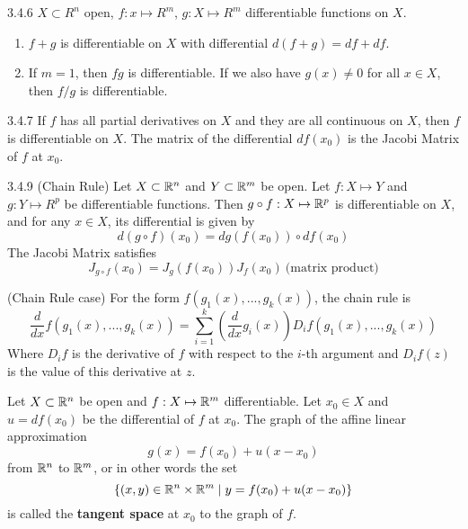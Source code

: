 \begin{proposition}{3.4.6}
    $X \subset R^n$ open, $f: x \mapsto R^m$, $g: X \mapsto R^m$ differentiable functions on $X$.
    \begin{enumerate}
        \item $f + g$ is differentiable on $X$ with differential $d(f + g) = df + df$.
        \item If $m = 1$, then $fg$ is differentiable. If we also have $g(x) \ne 0$ for all
              $x \in X$, then $f/g$ is differentiable.
    \end{enumerate}
\end{proposition}

\begin{proposition}{3.4.7}
    If $f$ has all partial derivatives on $X$ and they are all continuous on $X$, then $f$ is differentiable on $X$.
    The matrix of the differential $df(x_0)$ is the Jacobi Matrix of $f$ at $x_0$.
\end{proposition}

\begin{proposition}{3.4.9 (Chain Rule)}
    Let $X \subset \mathbb{R}^n$ and $Y \subset \mathbb{R}^m$ be open.
    Let $f: X \mapsto Y$ and $g: Y \mapsto R^p$ be differentiable functions.
    Then $g \circ f: X \mapsto \mathbb{R}^p$ is differentiable on $X$, and for any $x \in X$, its differential is given by
    \[ d(g \circ f)(x_0) = dg(f(x_0)) \circ df(x_0) \]
    The Jacobi Matrix satisfies
    \[ J_{g \circ f}(x_0) = J_g(f(x_0)) J_f(x_0)\ \mbox{(matrix product)}\]
\end{proposition}

\begin{proposition}{(Chain Rule case)}
    For the form $f(g_1(x), ..., g_k(x))$, the chain rule is
    \[ \frac{d}{dx}f(g_1(x), ..., g_k(x)) = \sum_{i=1}^k \left( \frac{d}{dx}g_i(x) \right) D_if(g_1(x), ..., g_k(x)) \]
    Where $D_i f$ is the derivative of $f$ with respect to the $i$-th argument and $D_i f(z)$ is the value of
    this derivative at $z$.
\end{proposition}

\begin{definition}
    Let $X \subset \mathbb{R}^n$ be open and $f: X \mapsto \mathbb{R}^m$ differentiable.
    Let $x_0 \in X$ and $u = df(x_0)$ be the differential of $f$ at $x_0$. The graph of the affine linear approximation
    \[ g(x) = f(x_0) + u(x - x_0) \]
    from $\mathbb{R}^n$ to $\mathbb{R}^m$, or in other words the set
    \[ \left\{ (x,y) \in \mathbb{R}^n \times \mathbb{R}^m \mid y = f(x_0) + u(x - x_0) \right\} \]
    is called the \textbf{tangent space} at $x_0$ to the graph of $f$.
\end{definition}

